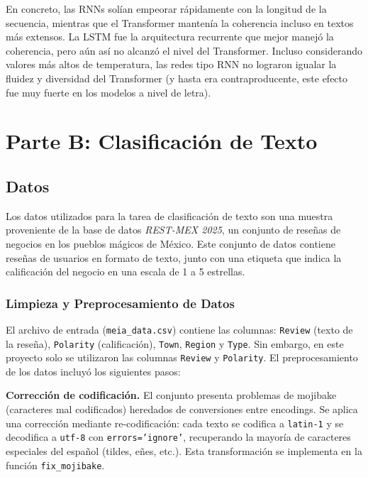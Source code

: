 \documentclass[paper=letter, fontsize=11pt, draft=false]{scrartcl}
\numberwithin{equation}{section} %
\numberwithin{figure}{section} %
\numberwithin{table}{section} %
\numberwithin{subsection}{section}
\begin{document}
En concreto, las RNNs solían empeorar rápidamente con la longitud de la secuencia, mientras que el Transformer mantenía la coherencia incluso en textos más extensos. La LSTM fue la arquitectura recurrente que mejor manejó la coherencia, pero aún así no alcanzó el nivel del Transformer. Incluso considerando valores más altos de temperatura, las redes tipo RNN no lograron igualar la fluidez y diversidad del Transformer (y hasta era contraproducente, este efecto fue muy fuerte en los modelos a nivel de letra).




\newpage
\section{Parte B: Clasificación de Texto}

\subsection{Datos}

Los datos utilizados para la tarea de clasificación de texto son una muestra proveniente de la base de datos \textit{REST-MEX 2025}, un conjunto de reseñas de negocios en los pueblos mágicos de México. Este conjunto de datos contiene reseñas de usuarios en formato de texto, junto con una etiqueta que indica la calificación del negocio en una escala de 1 a 5 estrellas.

\subsubsection{Limpieza y Preprocesamiento de Datos}

El archivo de entrada (\texttt{meia\_data.csv}) contiene las columnas: \texttt{Review} (texto de la reseña), \texttt{Polarity} (calificación), \texttt{Town}, \texttt{Region} y \texttt{Type}. Sin embargo, en este proyecto solo se utilizaron las columnas \texttt{Review} y \texttt{Polarity}. El preprocesamiento de los datos incluyó los siguientes pasos:

\textbf{Corrección de codificación.} El conjunto presenta problemas de mojibake (caracteres mal codificados) heredados de conversiones entre encodings. Se aplica una corrección mediante re-codificación: cada texto se codifica a \texttt{latin-1} y se decodifica a \texttt{utf-8} con \texttt{errors='ignore'}, recuperando la mayoría de caracteres especiales del español (tildes, eñes, etc.). Esta transformación se implementa en la función \texttt{fix\_mojibake}.
\end{document}
